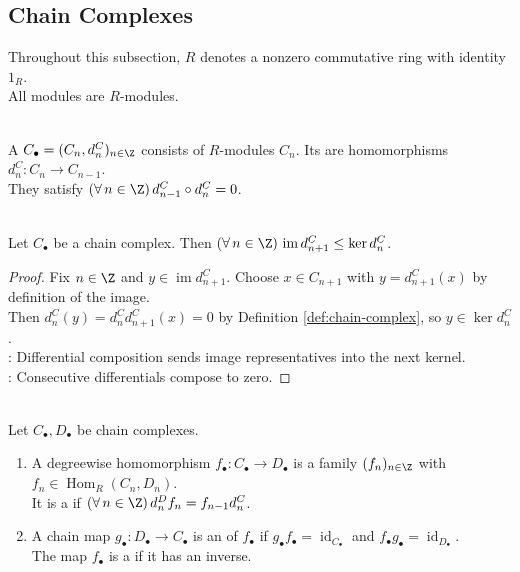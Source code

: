 \subsection{Chain Complexes}

Throughout this subsection, $R$ denotes a nonzero commutative ring with identity $1_R$.\\
All modules are $R$-modules.

\begin{definition} \label{def:chain-complex} \\
A  $C_\bullet=(C_n,d^C_n)_{n\in\Z}$ consists of $R$-modules $C_n$. Its  are homomorphisms $d^C_n:C_n\to C_{n-1}$.\\
They satisfy $(\forall\,n\in\Z)\,d^C_{n-1}\circ d^C_n=0$.
\end{definition}

\begin{proposition} \label{prop:chain-complex-image-kernel-containment} \\
Let $C_\bullet$ be a chain complex. Then $(\forall\,n\in\Z)\,\operatorname{im}d^C_{n+1}\leq\ker d^C_n$.
\begin{proof} Fix $n\in\Z$ and $y\in\operatorname{im}d^C_{n+1}$. Choose $x\in C_{n+1}$ with $y=d^C_{n+1}(x)$ by definition of the image.\\
Then $d^C_n(y)=d^C_nd^C_{n+1}(x)=0$ by Definition \ref{def:chain-complex}, so $y\in\ker d^C_n$.\\
: Differential composition sends image representatives into the next kernel.\\
: Consecutive differentials compose to zero.
\end{proof}
\end{proposition}

\begin{definition} \label{def:chain-map-and-isomorphism} \\
Let $C_\bullet,D_\bullet$ be chain complexes.
\begin{enumerate}[label=(\roman*)]
\setlength{\itemsep}{0pt}
\item A degreewise homomorphism $f_\bullet:C_\bullet\to D_\bullet$ is a family $(f_n)_{n\in\Z}$ with $f_n\in\operatorname{Hom}_R(C_n,D_n)$.\\
It is a  if $(\forall\,n\in\Z)\,d^D_n f_n=f_{n-1}d^C_n$.
\item A chain map $g_\bullet:D_\bullet\to C_\bullet$ is an  of $f_\bullet$ if $g_\bullet f_\bullet=\operatorname{id}_{C_\bullet}$ and $f_\bullet g_\bullet=\operatorname{id}_{D_\bullet}$.\\
The map $f_\bullet$ is a  if it has an inverse.
\end{enumerate}
\end{definition}

